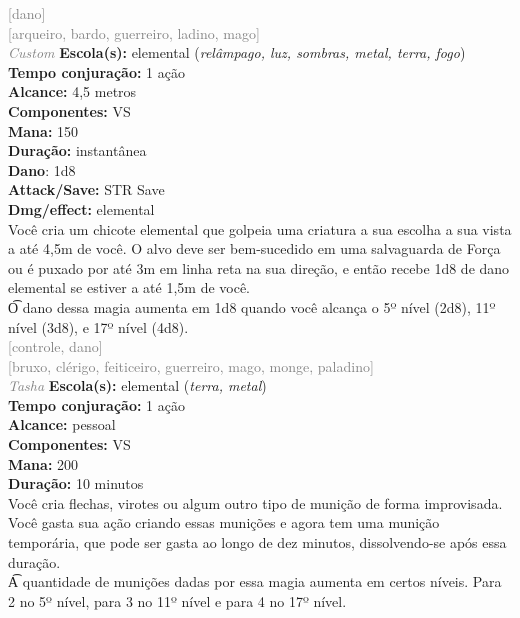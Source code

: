 \documentclass{RPG_Adventure}[2021/10/20]
\begin{document}
{\scriptsize \textcolor{gray}{[dano]\\}}
{\scriptsize \textcolor{gray}{[arqueiro, bardo, guerreiro, ladino, mago]\\}}
{\tiny \textcolor{gray}{\textit{Custom}}}\jump{}
{\small \t \textbf{Escola(s):} elemental (\textit{relâmpago, luz, sombras, metal, terra, fogo})\\\t \textbf{Tempo conjuração:} 1 ação\\\t \textbf{Alcance:} 4,5 metros\\\t \textbf{Componentes:} VS\\\t \textbf{Mana:} 150\\\t \textbf{Duração:} instantânea\\\t \textbf{Dano}: 1d8\\\t \textbf{Attack/Save:} STR Save\\\t \textbf{Dmg/effect:} elemental\\}
{\normalsize Você cria um chicote elemental que golpeia uma criatura a sua escolha a sua vista a até 4,5m de você. O alvo deve ser bem-sucedido em uma salvaguarda de Força ou é puxado por até 3m em linha reta na sua direção, e então recebe 1d8 de dano elemental se estiver a até 1,5m de você.\\\t O dano dessa magia aumenta em 1d8 quando você alcança o 5º nível (2d8), 11º nível (3d8), e 17º nível (4d8).\\}
{\scriptsize \textcolor{gray}{[controle, dano]\\}}
{\scriptsize \textcolor{gray}{[bruxo, clérigo, feiticeiro, guerreiro, mago, monge, paladino]\\}}
{\tiny \textcolor{gray}{\textit{Tasha}}}\jump{}
{\small \t \textbf{Escola(s):} elemental (\textit{terra, metal})\\\t \textbf{Tempo conjuração:} 1 ação\\\t \textbf{Alcance:} pessoal\\\t \textbf{Componentes:} VS\\\t \textbf{Mana:} 200\\\t \textbf{Duração:} 10 minutos\\}
{\normalsize Você cria flechas, virotes ou algum outro tipo de munição de forma improvisada. Você gasta sua ação criando essas munições e agora tem uma munição temporária, que pode ser gasta ao longo de dez minutos, dissolvendo-se após essa duração.\\\t A quantidade de munições dadas por essa magia aumenta em certos níveis. Para 2 no 5º nível, para 3 no 11º nível e para 4 no 17º nível.\\}
\end{document}
